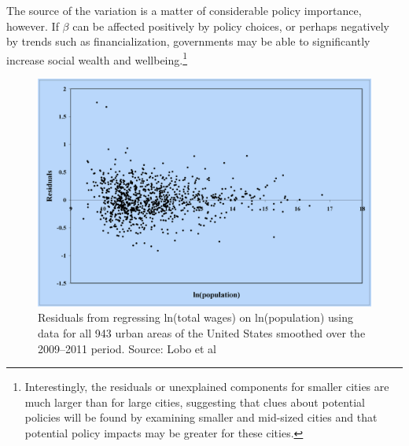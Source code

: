 

The source of the variation is a matter of considerable policy importance, however. If $\beta$ can be affected positively by policy choices, or perhaps negatively by trends such as financialization, governments may be able to significantly increase social wealth and wellbeing.\footnote{Interestingly, the residuals or unexplained components for smaller cities are much larger than for large cities, suggesting that clues about potential policies will be found by examining smaller and mid-sized cities and that potential policy impacts may be greater for these cities.}

\begin{figure}
    \centering
    \includegraphics[scale=0.25]{fig/Residuals-Lobo.png}
    \caption{Residuals from regressing ln(total wages) on ln(population) using data for all 943 urban areas of the United States smoothed over the 2009–2011 period. Source: Lobo et al \cite{loboUrbanScalingProduction2013}}
    \label{fig:Residuals-Lobo}
\end{figure}


